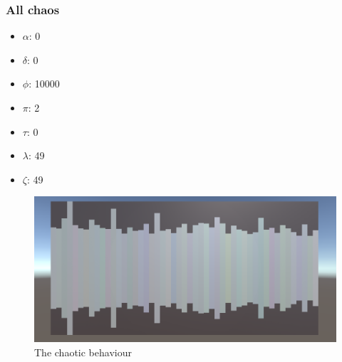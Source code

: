 \documentclass[a4paper,english]{report}
\begin{document}
	\subsubsection{All chaos}
	\begin{samepage}\begin{itemize}
		\item $\alpha$: 0
		\item $\delta$: 0
		\item $\phi$: 10000
		\item $\pi$: 2
		\item $\tau$: 0
		\item $\lambda$: 49
		\item $\zeta$: 49
	\end{itemize}\end{samepage}
	\begin{figure}
		\centering
		\includegraphics[width=1\linewidth]{chaos_vis}
		\caption{The chaotic behaviour}
		\label{fig:chaos_vis}
	\end{figure}
\end{document}
